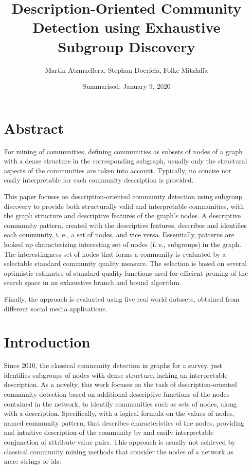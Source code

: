 \documentclass[a4paper]{article}
\title{Description-Oriented Community Detection using Exhaustive Subgroup Discovery}
\date{Summarised: January 9, 2020}
\author{Martin Atzmuellera, Stephan Doerfela, Folke Mitzlaffa}
\begin{document}
\maketitle
\section{Abstract}
For mining of communities, defining communities as subsets of nodes of a graph with a dense structure in the corresponding subgraph, usually only the structural aspects of the communities are taken into account. Typically, no concise nor easily interpretable for each community description is provided.

This paper focuses on description-oriented community detection using subgroup discovery to provide both structurally valid and interpretable communities, with the graph structure and descriptive features of the graph’s nodes. A descriptive community pattern, created with the descriptive features, describes and identifies each community, i. e., a set of nodes, and vice versa.
Essentially, patterns are looked up characterizing interesting set of nodes (i. e., subgroups) in the graph. The interestingness set of nodes that forms a community is evaluated by a selectable standard community quality measure.
The selection is based on several optimistic estimates of standard quality functions used for efficient pruning of the search space in an exhaustive branch and bound algorithm.

Finally, the approach is evaluated using five real world datasets, obtained from different social media applications.

\section{Introduction}
Since 2010, the classical community detection in graphs for a survey, just identifies subgroups of nodes with dense structure, lacking an interpretable description.
As a novelty, this work focuses on the task of description-oriented community detection based on additional descriptive functions of the nodes contained in the network, to identify communities such as sets of nodes, along with a description. Specifically, with a logical formula on the values of nodes, named community pattern, that describes characteristics of the nodes, providing and intuitive description of the community by and easily interpretable conjunction of attribute-value pairs.
This approach is usually not achieved by classical community mining methods that consider the nodes of a network as mere strings or ids.
\end{document}
